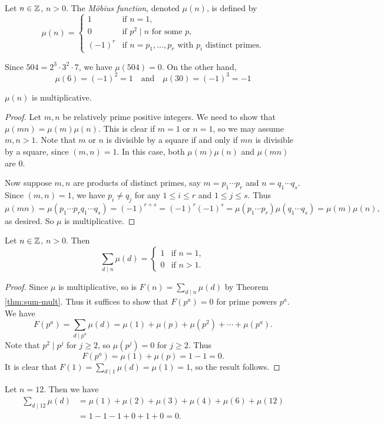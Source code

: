 \begin{definition}
  Let $n \in \mathbb{Z}$, $n > 0$. The
  \emph{M\"obius function}, denoted
  $\mu(n)$, is defined by
  \[
    \mu(n) =
    \begin{cases}
      1 & \text{if } n = 1, \\
      0 & \text{if } p^2 \mid n \text{ for some } p, \\
      (-1)^r & \text{if $n = p_1, \dots, p_r$ with $p_i$ distinct primes}.
    \end{cases}
  \]
\end{definition}

\begin{example}
  Since $504 = 2^3 \cdot 3^2 \cdot 7$,
  we have $\mu(504) = 0$. On the other
  hand,
  \[\mu(6) = (-1)^2 = 1 \quad \text{and}\quad
  \mu(30) = (-1)^3 = -1\]
\end{example}

\begin{theorem}
  $\mu(n)$ is multiplicative.
\end{theorem}

\begin{proof}
  Let $m, n$ be relatively prime
  positive integers. We need to show
  that $\mu(mn) = \mu(m) \mu(n)$.
  This is clear if $m = 1$ or $n = 1$,
  so we may assume $m, n > 1$.
  Note that $m$ or $n$ is divisible
  by a square if and only if $mn$
  is divisible by a square, since
  $(m, n) = 1$. In this case, both
  $\mu(m) \mu(n)$ and $\mu(mn)$ are $0$.

  Now suppose $m, n$ are products
  of distinct primes, say
  $m = p_1 \cdots p_r$ and
  $n = q_1 \cdots q_s$. Since
  $(m, n) = 1$, we have $p_i \ne q_j$
  for any $1 \le i \le r$ and
  $1 \le j \le s$. Thus
  \[
    \mu(mn)
    = \mu(p_1 \cdots p_r q_1 \cdots q_s)
    = (-1)^{r + s}
    = (-1)^r (-1)^s
    = \mu(p_1 \cdots p_r) \mu(q_1 \cdots q_s)
    = \mu(m) \mu(n),
  \]
  as desired. So $\mu$ is multiplicative.
\end{proof}

\begin{prop}
  Let $n \in \mathbb{Z}$, $n > 0$. Then
  \[
    \sum_{d \mid n} \mu(d)
    =
    \begin{cases}
      1 & \text{if } n = 1, \\
      0 & \text{if } n > 1.
    \end{cases}
  \]
\end{prop}

\begin{proof}
  Since $\mu$ is multiplicative,
  so is $F(n) = \sum_{d \mid n} \mu(d)$
  by Theorem \ref{thm:sum-mult}. Thus
  it suffices to show that
  $F(p^a) = 0$ for prime powers $p^a$.
  We have
  \[
    F(p^a)
    = \sum_{d \mid p^a} \mu(d)
    = \mu(1) + \mu(p) + \mu(p^2) + \cdots + \mu(p^a).
  \]
  Note that $p^2 \mid p^j$ for $j \ge 2$,
  so $\mu(p^j) = 0$ for $j \ge 2$.
  Thus
  \[
    F(p^a) = \mu(1) + \mu(p) = 1 - 1 = 0.
  \]
  It is clear that
  $F(1) = \sum_{d \mid 1} \mu(d) = \mu(1) = 1$, so
  the result follows.
\end{proof}

\begin{example}
  Let $n = 12$. Then we have
  \begin{align*}
    \sum_{d \mid 12} \mu(d)
    &= \mu(1) + \mu(2) + \mu(3) + \mu(4) + \mu(6) + \mu(12) \\
    &= 1 - 1 - 1 + 0 + 1 + 0
    = 0.
  \end{align*}
\end{example}

